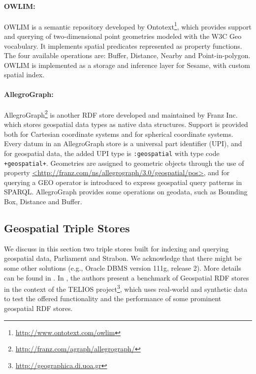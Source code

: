 \paragraph{OWLIM:}
OWLIM is a semantic repository developed by Ontotext\footnote{\url{http://www.ontotext.com/owlim}}, which provides support and querying of
two-dimensional point geometries modeled with the W3C Geo vocabulary. It implements spatial predicates represented as property functions. The  four available operations are: Buffer, Distance, Nearby and Point-in-polygon. OWLIM is implemented as a storage and inference layer for Sesame, with custom spatial index.

\paragraph{AllegroGraph:}
AllegroGraph\footnote{\url{http://franz.com/agraph/allegrograph/}} is another RDF store developed and maintained by Franz Inc. which stores geospatial data types as native data structures. Support is provided both for Cartesian coordinate systems and for spherical coordinate systems. Every datum in an AllegroGraph store is a universal part identifier (UPI), and for geospatial data, the added UPI type is \texttt{:geospatial} with type code \texttt{+geospatial+}. Geometries are assigned to geometric objects through the use of property \url{<http://franz.com/ns/allegrograph/3.0/geospatial/pos>}, and for querying a GEO operator is introduced to express geospatial query patterns in SPARQL. AllegroGraph provides some operations on geodata, such as Bounding Box, Distance and Buffer.



\subsection{Geospatial Triple Stores}
\label{sec:geotps}
We discuss in this section two triple stores built for indexing and querying geospatial data, Parliament and Strabon. We acknowledge that there might be some other solutions (e.g., Oracle DBMS version 111g, release 2). More details can be found in \cite{koubarakis12, battle12, garbis13}. In \cite{garbis13}, the authors present a benchmark of Geospatial RDF stores in the context of the TELIOS project\footnote{\url{http://geographica.di.uoa.gr}}, which uses real-world and synthetic data to test the offered functionality and the performance of some prominent geospatial RDF stores.

